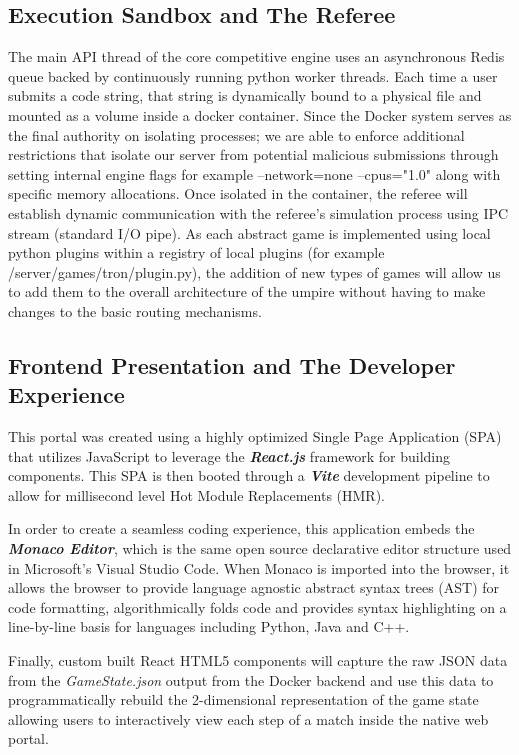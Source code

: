 \documentclass[12pt,a4paper]{report}
\begin{document}
\subsection{Execution Sandbox and The Referee}
The main API thread of the core competitive engine uses an asynchronous Redis queue backed by continuously running python worker threads. Each time a user submits a code string, that string is dynamically bound to a physical file and mounted as a volume inside a docker container. Since the Docker system serves as the final authority on isolating processes; we are able to enforce additional restrictions that isolate our server from potential malicious submissions through setting internal engine flags for example --network=none --cpus="1.0" along with specific memory allocations. Once isolated in the container, the referee will establish dynamic communication with the referee's simulation process using IPC stream (standard I/O pipe). As each abstract game is implemented using local python plugins within a registry of local plugins (for example /server/games/tron/plugin.py), the addition of new types of games will allow us to add them to the overall architecture of the umpire without having to make changes to the basic routing mechanisms.

\subsection{Frontend Presentation and The Developer Experience}
This portal was created using a highly optimized Single Page Application (SPA) that utilizes JavaScript to leverage the \textit{\textbf{React.js}} framework for building components. This SPA is then booted through a \textit{\textbf{Vite}} development pipeline to allow for millisecond level Hot Module Replacements (HMR).

In order to create a seamless coding experience, this application embeds the \textit{\textbf{Monaco Editor}}, which is the same open source declarative editor structure used in Microsoft's Visual Studio Code. When Monaco is imported into the browser, it allows the browser to provide language agnostic abstract syntax trees (AST) for code formatting, algorithmically folds code and provides syntax highlighting on a line-by-line basis for languages including Python, Java and C++.

Finally, custom built React HTML5 components will capture the raw JSON data from the \textit{GameState.json} output from the Docker backend and use this data to programmatically rebuild the 2-dimensional representation of the game state allowing users to interactively view each step of a match inside the native web portal.
\end{document}
